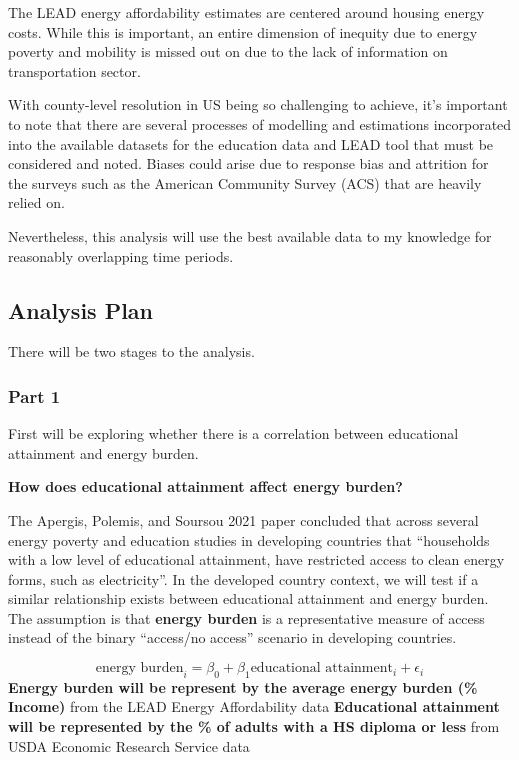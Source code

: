 \documentclass[
]{article}
\begin{document}
The LEAD energy affordability estimates are centered around housing
energy costs. While this is important, an entire dimension of inequity
due to energy poverty and mobility is missed out on due to the lack of
information on transportation sector.

With county-level resolution in US being so challenging to achieve, it's
important to note that there are several processes of modelling and
estimations incorporated into the available datasets for the education
data and LEAD tool that must be considered and noted. Biases could arise
due to response bias and attrition for the surveys such as the American
Community Survey (ACS) that are heavily relied on.

Nevertheless, this analysis will use the best available data to my
knowledge for reasonably overlapping time periods.

\hypertarget{analysis-plan}{%
\subsection{Analysis Plan}\label{analysis-plan}}

There will be two stages to the analysis.

\hypertarget{part-1}{%
\subsubsection{Part 1}\label{part-1}}

First will be exploring whether there is a correlation between
educational attainment and energy burden.

\textbf{How does educational attainment affect energy burden?}

The Apergis, Polemis, and Soursou 2021 paper concluded that across
several energy poverty and education studies in developing countries
that ``households with a low level of educational attainment, have
restricted access to clean energy forms, such as electricity''. In the
developed country context, we will test if a similar relationship exists
between educational attainment and energy burden. The assumption is that
\textbf{energy burden} is a representative measure of access instead of
the binary ``access/no access'' scenario in developing countries.

\[\text{energy burden}_i = \beta_0 + \beta_1 \text{educational attainment}_i + \epsilon_i\]
\textbf{Energy burden will be represent by the average energy burden (\%
Income)} from the LEAD Energy Affordability data \textbf{Educational
attainment will be represented by the \% of adults with a HS diploma or
less} from USDA Economic Research Service data
\end{document}
